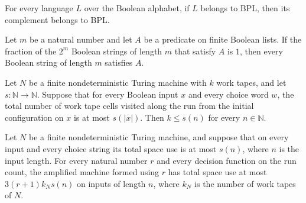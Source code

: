 \begin{theorem}
\label{Randomized.compl_mem_BPL}
\leanok
{}
For every language $L$ over the Boolean alphabet, if $L$ belongs to BPL, then its
complement belongs to BPL.
\end{theorem}

\begin{theorem}
\label{Randomized.forall_of_randProb_eq_one}
\leanok
{}
Let $m$ be a natural number and let $A$ be a predicate on finite Boolean lists. If the
fraction of the $2^m$ Boolean strings of length $m$ that satisfy $A$ is $1$, then every
Boolean string of length $m$ satisfies $A$.
\end{theorem}

\begin{theorem}
\label{Turing.FinNDTM.UsesSpace.k_le}
\leanok
{}
Let $N$ be a finite nondeterministic Turing machine with $k$ work tapes, and let
$s\colon\mathbb{N}\to\mathbb{N}$. Suppose that for every Boolean input $x$ and every
choice word $w$, the total number of work tape cells visited along the run from the
initial configuration on $x$ is at most $s(|x|)$. Then $k\le s(n)$ for every
$n\in\mathbb{N}$.
\end{theorem}

\begin{theorem}
\label{Randomized.amp_usesSpace_mul}
\leanok
{}
Let $N$ be a finite nondeterministic Turing machine, and suppose that on every input and
every choice string its total space use is at most $s(n)$, where $n$ is the input
length. For every natural number $r$ and every decision function on the run count, the
amplified machine formed using $r$ has total space use at most $3(r+1)k_Ns(n)$ on inputs
of length $n$, where $k_N$ is the number of work tapes of $N$.
\end{theorem}

